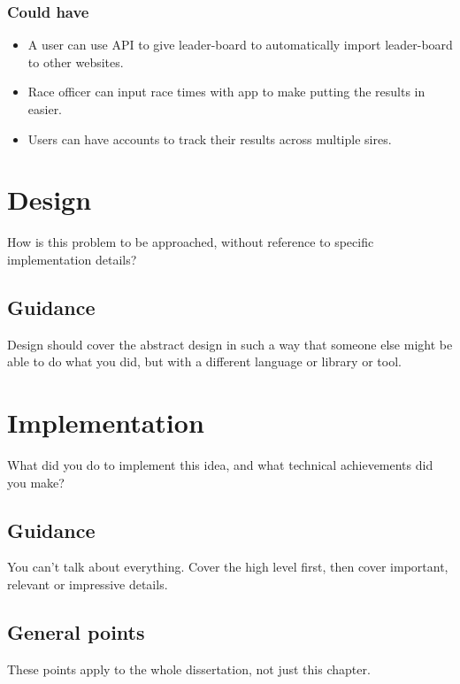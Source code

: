 \documentclass{l4proj}
\begin{document}
\subsection{Could have}
\begin{itemize}
    \item
    A user can use  API to give leader-board to automatically import leader-board to other websites.
    \item
    Race officer can input race times with app to make putting the results in easier.
    \item
    Users can have accounts to track their results across multiple sires.
\end{itemize}

\chapter{Design}
How is this problem to be approached, without reference to specific implementation details? 
\section{Guidance}
Design should cover the abstract design in such a way that someone else might be able to do what you did, but with a different language or library or tool.

\chapter{Implementation}
What did you do to implement this idea, and what technical achievements did you make?
\section{Guidance}
You can't talk about everything. Cover the high level first, then cover important, relevant or impressive details.



\section{General points}

These points apply to the whole dissertation, not just this chapter.
\end{document}
